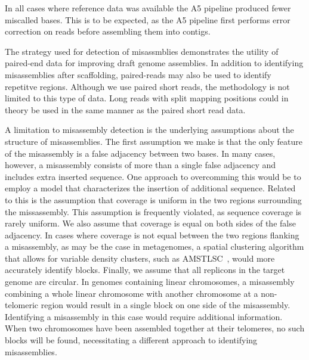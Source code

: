 \documentclass{bioinfo}
\begin{document}
In all cases where reference data was available the A5 pipeline produced fewer miscalled bases. This is to
be expected, as the A5 pipeline first performs error correction on reads before assembling them into contigs.

The strategy used for detection of misassmblies demonstrates the utility of paired-end data for improving draft genome assemblies.
In addition to identifying misassemblies after scaffolding, paired-reads may also be used to identify repetitve regions.   
Although we use paired short reads, the methodology is not limited to this type of data. Long reads with split mapping positions 
could in theory be used in the same manner as the paired short read data.

A limitation to misassembly detection is the underlying assumptions about the structure of misassemblies. The first assumption we make
is that the only feature of the misassembly is a false adjacency between two bases.
In many cases, however, a misassembly consists of more than a single false adjacency and includes extra inserted sequence.  One approach to
overcomming this would be to employ a model that characterizes the insertion of additional sequence. Related to this is the assumption 
that coverage is uniform in the two regions surrounding the missassembly. This assumption is frequently violated, as sequence coverage
is rarely uniform. We also assume that coverage is equal on both sides of the false adjacency. In cases where coverage is not equal between 
the two regions flanking a misassembly, as may be the case in metagenomes, a spatial clustering algorithm that allows for variable density
clusters, such as AMSTLSC~\citep{AMSTLSC}, would more accurately identify blocks. Finally, we assume that all replicons in the target genome
are circular. In genomes containing linear chromosomes, a misassembly combining a whole linear chromosome with another chromosome
at a non-telomeric region would result in a single block on one side of the misassembly. Identifying a misassembly in this case
would require additional information. When two chromosomes have been assembled together at their telomeres, no such blocks will be found, 
necessitating a different approach to identifying misassemblies.
\end{document}
